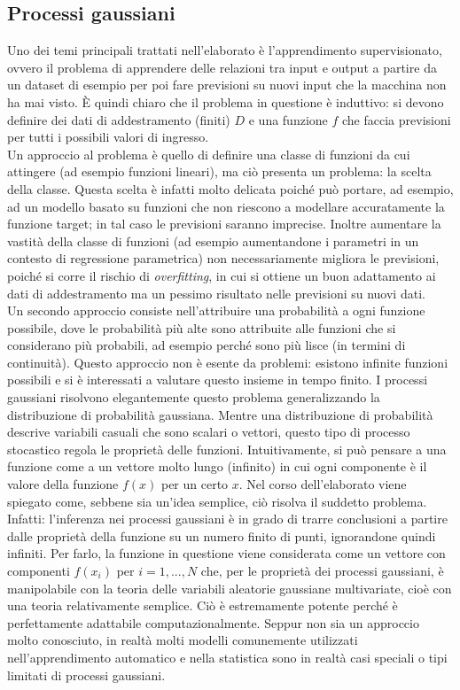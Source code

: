 \subsection{Processi gaussiani}
Uno dei temi principali trattati nell'elaborato è l'apprendimento supervisionato, ovvero il problema di apprendere delle relazioni tra input e output a partire da un dataset di esempio per poi fare previsioni su nuovi input che la macchina non ha mai visto. È quindi chiaro che il problema in questione è induttivo: si devono definire dei dati di addestramento (finiti) $D$ e una funzione $f$ che faccia previsioni per tutti i possibili valori di ingresso.\\
Un approccio al problema è quello di definire una classe di funzioni da cui attingere (ad esempio funzioni lineari), ma ciò presenta un problema: la scelta della classe. Questa scelta è infatti molto delicata poiché può portare, ad esempio, ad un modello basato su funzioni che non riescono a modellare accuratamente la funzione target; in tal caso le previsioni saranno imprecise. Inoltre aumentare la vastità della classe di funzioni (ad esempio aumentandone i parametri in un contesto di regressione parametrica) non necessariamente migliora le previsioni, poiché si corre il rischio di \textit{overfitting}, in cui si ottiene un buon adattamento ai dati di addestramento ma un pessimo risultato nelle previsioni su nuovi dati.\\
Un secondo approccio consiste nell'attribuire una probabilità a ogni funzione possibile, dove le probabilità più alte sono attribuite alle funzioni che si considerano più probabili, ad esempio perché sono più lisce (in termini di continuità). Questo approccio non è esente da problemi: esistono infinite funzioni possibili e si è interessati a valutare questo insieme in tempo finito. I processi gaussiani risolvono elegantemente questo problema generalizzando la distribuzione di probabilità gaussiana. Mentre una distribuzione di probabilità descrive variabili casuali che sono scalari o vettori, questo tipo di processo stocastico regola le proprietà delle funzioni. Intuitivamente, si può pensare a una funzione come a un vettore molto lungo (infinito) in cui ogni componente è il valore della funzione $f(x)$ per un certo $x$. Nel corso dell'elaborato viene spiegato come, sebbene sia un'idea semplice, ciò risolva il suddetto problema. Infatti: l'inferenza nei processi gaussiani è in grado di trarre conclusioni a partire dalle proprietà della funzione su un numero finito di punti, ignorandone quindi infiniti. Per farlo, la funzione in questione viene considerata come un vettore con componenti $f(x_i)$ per $i=1,...,N$ che, per le proprietà dei processi gaussiani, è manipolabile con la teoria delle variabili aleatorie gaussiane multivariate, cioè con una teoria relativamente semplice. Ciò è estremamente potente perché è perfettamente adattabile computazionalmente. Seppur non sia un approccio molto conosciuto, in realtà molti modelli comunemente utilizzati nell'apprendimento automatico e nella statistica sono in realtà casi speciali o tipi limitati di processi gaussiani. 

